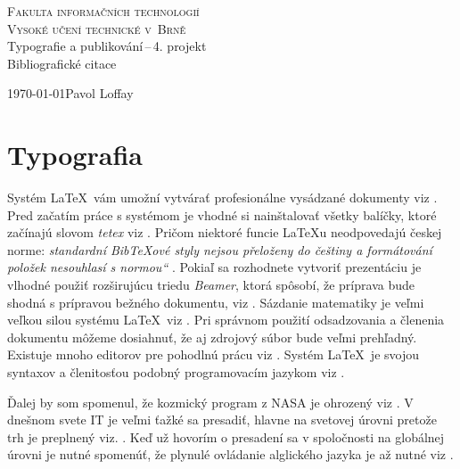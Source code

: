 \documentclass[11pt,a4paper,titlepage]{article}
\newcommand\czuv[1]{\quotedblbase #1\textquotedblleft}
\begin{document}
\begin{titlepage}
	\begin{center}
		{\Large \textsc{Fakulta informačních technologií}}\\
		{\Large \textsc{Vysoké učení technické v~Brně}}\\
		\bigskip
		{\LARGE Typografie a publikování\,--\,4. projekt\\}
		\medskip
		{\Huge Bibliografické citace}
	\end{center}
	\Large{\today \hfill Pavol Loffay}
	\bigskip
\end{titlepage}


\section{Typografia}
	Systém \LaTeX\ vám umožní vytvárať profesionálne vysádzané dokumenty viz \cite{latex:rybicka}.
	Pred začatím práce s systémom je vhodné si nainštalovať všetky balíčky, 
	ktoré začínajú slovom \emph{tetex} viz \cite{michal:svamberg:root}. Pričom niektoré 
	funcie \LaTeX u neodpovedajú českej norme: \textit{\czuv{standardní BibTeXové styly nejsou přeloženy 
	do češtiny a formátování položek nesouhlasí s normou}} \cite{david:martinek:latex}.
	Pokiaľ sa rozhodnete vytvoriť prezentáciu je vlhodné použiť rozširujúcu triedu \emph{Beamer}, ktorá 
	spôsobí, že príprava bude shodná s prípravou bežného dokumentu, viz \cite{petr:zelenka:abclinux}.
	Sázdanie matematiky je veľmi veľkou silou systému \LaTeX\ viz \cite{latex:math}.
	Pri správnom použití odsadzovania a členenia dokumentu môžeme dosiahnuť, že aj zdrojový súbor 
	bude veľmi prehľadný. Existuje mnoho editorov pre pohodlnú prácu  viz \cite{latex:bakalarka}.
	Systém \LaTeX\ je svojou syntaxov a členitosťou podobný programovacím jazykom viz \cite{latex:diplomovka}.
	
	\noindent Ďalej by som spomenul, že kozmický program z NASA je ohrozený viz \cite{cio:clanok}.
	V dnešnom svete IT je veľmi ťažké sa presadiť, hlavne na svetovej úrovni pretože trh je
	preplnený viz. \cite{cio:casopis}. Keď už hovorím o presadení sa v spoločnosti na globálnej úrovni je
	nutné spomenúť, že plynulé ovládanie alglického jazyka je až nutné viz \cite{typo:clanok}.

\newpage


\end{document}
